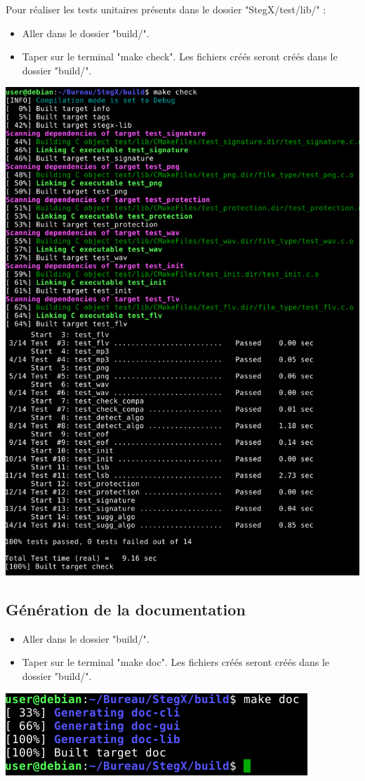 \documentclass[11pt]{article}
\begin{document}
Pour réaliser les tests unitaires présents dans le dossier "StegX/test/lib/" : 
\begin{itemize}
\item Aller dans le dossier "build/".
\item Taper sur le terminal "make check". Les fichiers créés seront créés 
dans le dossier "build/".
\end{itemize}
\vspace{0.5cm}
\hspace{3cm}
\includegraphics[scale=0.45]{pictures/check.png}
\vspace{1cm}

\subsection{Génération de la documentation}
\begin{itemize}
\item Aller dans le dossier "build/".
\item Taper sur le terminal "make doc". Les fichiers créés seront créés 
dans le dossier "build/". 
\end{itemize}
\vspace{0.5cm}
\hspace{3cm}
\includegraphics[scale=0.7]{pictures/doc.png}
\end{document}
